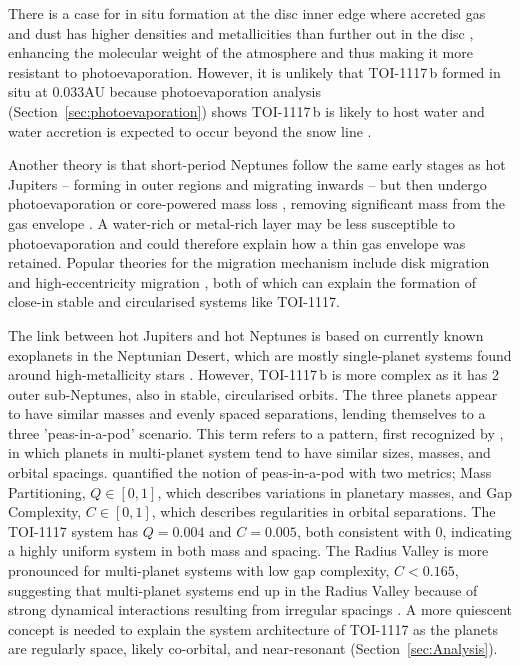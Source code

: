 \documentclass[fleqn,usenatbib,useAMS]{mnras}
\begin{document}
There is a case for in situ formation at the disc inner edge where accreted gas and dust has higher densities and metallicities than further out in the disc \citep{Ogihara}, enhancing the molecular weight of the atmosphere and thus making it more resistant to photoevaporation. However, it is unlikely that TOI-1117\,b formed in situ at 0.033AU because photoevaporation analysis (Section~\ref{sec:photoevaporation}) shows TOI-1117\,b is likely to host water and water accretion is expected to occur beyond the snow line \citep{Dawson2018}.

Another theory is that short-period Neptunes follow the same early stages as hot Jupiters -- forming in outer regions and migrating inwards -- but then undergo photoevaporation or core-powered mass loss \citep{Gupta2020}, removing significant mass from the gas envelope \citep{Dawson2018}. A water-rich or metal-rich layer may be less susceptible to photoevaporation and could therefore explain how a thin gas envelope was retained. Popular theories for the migration mechanism include disk migration \citep{Goldreich1979,Lin1996,Baruteau2014} and high-eccentricity migration \citep{WuMurray2003,FordRasio2008,Dawson2018}, both of which can explain the formation of close-in stable and circularised systems like TOI-1117.

The link between hot Jupiters and hot Neptunes is based on currently known exoplanets in the Neptunian Desert, which are mostly single-planet systems found around high-metallicity stars \citep{Dong2017}. However, TOI-1117\,b is more complex as it has 2 outer sub-Neptunes, also in stable, circularised orbits. The three planets appear to have similar masses and evenly spaced separations, lending themselves to a three 'peas-in-a-pod' scenario. This term refers to a pattern, first recognized by \citet{Weiss2018}, in which planets in multi-planet system tend to have similar sizes, masses, and orbital spacings. \citet{Gilbert2020} quantified the notion of peas-in-a-pod with two metrics; Mass Partitioning, $Q\in[0,1]$, which describes variations in planetary masses, and Gap Complexity, $C\in[0,1]$, which describes regularities in orbital separations. The TOI-1117 system has $Q=0.004$ and $C=0.005$, both consistent with 0, indicating a highly uniform system in both mass and spacing. The Radius Valley is more pronounced for multi-planet systems with low gap complexity, $C<0.165$, suggesting that multi-planet systems end up in the Radius Valley because of strong dynamical interactions resulting from irregular spacings \citep{Rice2024}. A more quiescent concept is needed to explain the system architecture of TOI-1117 as the planets are regularly space, likely co-orbital, and near-resonant (Section~\ref{sec:Analysis}).
\end{document}
